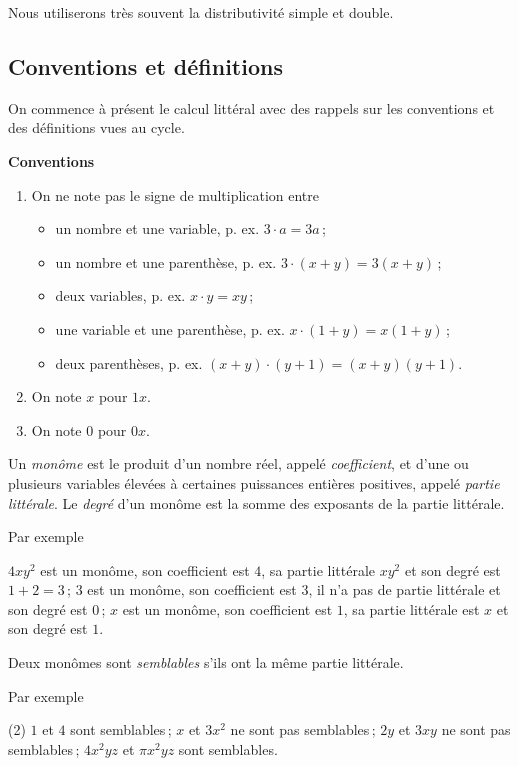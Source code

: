 \documentclass[a4paper,12pt]{report}
\begin{document}
\vspace{1em}
Nous utiliserons très souvent la distributivité simple et double. 
\subsection{Conventions et définitions}
On commence à présent le calcul littéral avec des rappels sur les conventions et des définitions vues au cycle.
\begin{center}
{\bfseries Conventions}
\begin{enumerate}
	\item[] On ne note pas le signe de multiplication entre 
		\begin{itemize}
			\item un nombre et une variable, p. ex. $3\cdot a =3a$\,;
			\item un nombre et une parenthèse, p. ex. $3\cdot (x+y)=3(x+y)$\,;
			\item deux variables, p. ex. $x\cdot y=xy$\,;
			\item une variable et une parenthèse, p. ex. $x\cdot (1+y)=x(1+y)$\,;
			\item deux parenthèses, p. ex. $(x+y)\cdot (y+1)=(x+y)(y+1)$.
		\end{itemize}
	\item[] On note $x$ pour $1x$.
	\item[] On note $0$ pour $0x$.
\end{enumerate}
	\end{center}
\begin{defi}[monôme]
	Un \emph{monôme} est le produit d'un nombre réel, appelé  \emph{coefficient}, et d'une ou plusieurs variables élevées à certaines puissances entières positives, appelé \emph{partie littérale}. Le \emph{degré} d'un monôme est la somme des exposants de la partie littérale.
\end{defi}
Par exemple
\begin{tasks}
	\task $4xy^2$ est un monôme, son coefficient est $4$, sa partie littérale $xy^2$ et son degré est $1+2=3$\,; 
	\task $3$ est un monôme, son coefficient est $3$, il n'a pas de partie littérale et son degré est $0$\,;
	\task $x$ est un monôme, son coefficient est $1$, sa partie littérale est $x$ et son degré est $1$. 
\end{tasks}
\begin{defi}
	Deux monômes sont \emph{semblables} s'ils ont la même partie littérale.
\end{defi}
Par exemple
\begin{tasks}(2)
	\task $1$ et $4$ sont semblables\,;
	\task $x$ et $3x^2$ ne sont pas semblables\,;
	\task $2y$ et $3xy$ ne sont pas semblables\,;
	\task $4x^2yz$ et $\pi x^2yz$ sont semblables.
\end{tasks}
\end{document}
